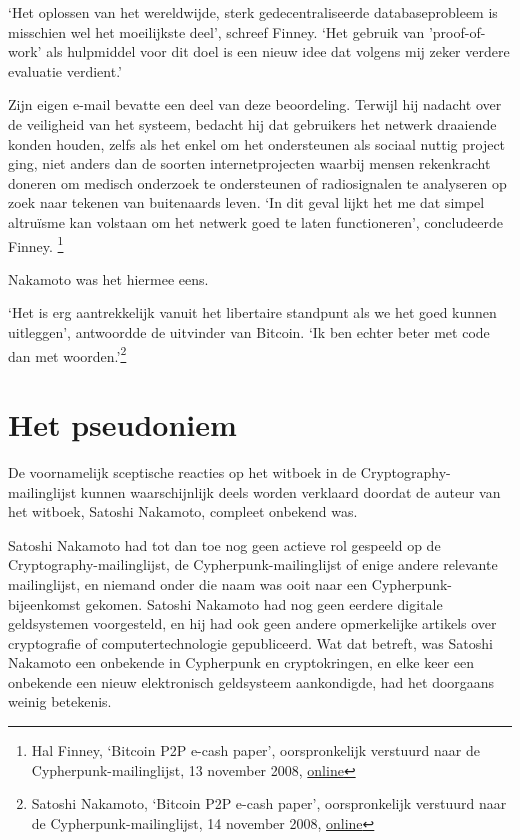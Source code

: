 \documentclass[smalldemyvopaper,11pt,twoside,onecolumn,openright,extrafontsizes,hidelinks]{memoir}
\begin{document}
`Het oplossen van het wereldwijde, sterk gedecentraliseerde
databaseprobleem is misschien wel het moeilijkste deel', schreef Finney.
`Het gebruik van 'proof-of-work' als hulpmiddel voor dit doel is een
nieuw idee dat volgens mij zeker verdere evaluatie verdient.'

Zijn eigen e-mail bevatte een deel van deze beoordeling. Terwijl hij
nadacht over de veiligheid van het systeem, bedacht hij dat gebruikers
het netwerk draaiende konden houden, zelfs als het enkel om het
ondersteunen als sociaal nuttig project ging, niet anders dan de soorten
internetprojecten waarbij mensen rekenkracht doneren om medisch
onderzoek te ondersteunen of radiosignalen te analyseren op zoek naar
tekenen van buitenaards leven. `In dit geval lijkt het me dat simpel
altruïsme kan volstaan om het netwerk goed te laten functioneren',
concludeerde Finney. \footnote{Hal Finney, `Bitcoin P2P e-cash paper',
  oorspronkelijk verstuurd naar de Cypherpunk-mailinglijst, 13 november
  2008,
  \href{https://www.metzdowd.com/pipermail/cryptography/2008-November/014848.html}{online}}

Nakamoto was het hiermee eens.

`Het is erg aantrekkelijk vanuit het libertaire standpunt als we het
goed kunnen uitleggen', antwoordde de uitvinder van Bitcoin. `Ik ben
echter beter met code dan met woorden.'\footnote{Satoshi Nakamoto,
  `Bitcoin P2P e-cash paper', oorspronkelijk verstuurd naar de
  Cypherpunk-mailinglijst, 14 november 2008,
  \href{https://www.metzdowd.com/pipermail/cryptography/2008-November/014853.html}{online}}

\section{Het pseudoniem}\label{het-pseudoniem}

De voornamelijk sceptische reacties op het witboek in de
Cryptography-mailinglijst kunnen waarschijnlijk deels worden verklaard
doordat de auteur van het witboek, Satoshi Nakamoto, compleet onbekend
was.

Satoshi Nakamoto had tot dan toe nog geen actieve rol gespeeld op de
Cryptography-mailinglijst, de Cypherpunk-mailinglijst of enige andere
relevante mailinglijst, en niemand onder die naam was ooit naar een
Cypherpunk-bijeenkomst gekomen. Satoshi Nakamoto had nog geen eerdere
digitale geldsystemen voorgesteld, en hij had ook geen andere
opmerkelijke artikels over cryptografie of computertechnologie
gepubliceerd. Wat dat betreft, was Satoshi Nakamoto een onbekende in
Cypherpunk en cryptokringen, en elke keer een onbekende een nieuw
elektronisch geldsysteem aankondigde, had het doorgaans weinig
betekenis.
\end{document}
